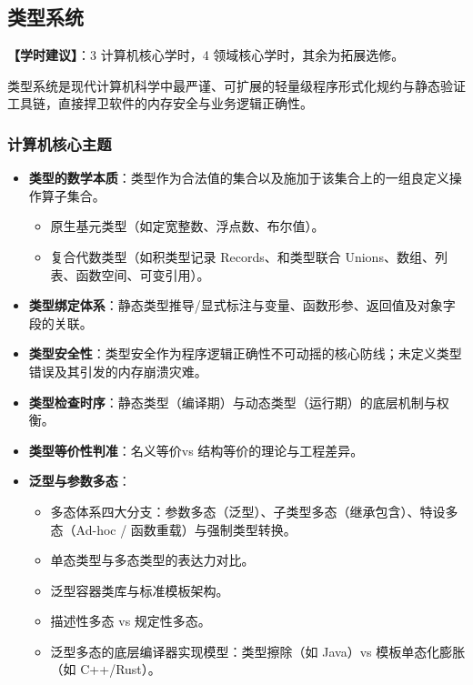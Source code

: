 \subsection{类型系统}
\textbf{【学时建议】}：3 计算机核心学时，4 领域核心学时，其余为拓展选修。

类型系统是现代计算机科学中最严谨、可扩展的轻量级程序形式化规约与静态验证工具链，直接捍卫软件的内存安全与业务逻辑正确性。

\subsubsection{计算机核心主题}
\begin{itemize}
    \item \textbf{类型的数学本质}：类型作为合法值的集合以及施加于该集合上的一组良定义操作算子集合。
    \begin{itemize}
        \item 原生基元类型（如定宽整数、浮点数、布尔值）。
        \item 复合代数类型（如积类型记录 Records、和类型联合 Unions、数组、列表、函数空间、可变引用）。
    \end{itemize}
    \item \textbf{类型绑定体系}：静态类型推导/显式标注与变量、函数形参、返回值及对象字段的关联。
    \item \textbf{类型安全性}：类型安全作为程序逻辑正确性不可动摇的核心防线；未定义类型错误及其引发的内存崩溃灾难。
    \item \textbf{类型检查时序}：静态类型（编译期）与动态类型（运行期）的底层机制与权衡。
    \item \textbf{类型等价性判准}：名义等价vs 结构等价的理论与工程差异。
    \item \textbf{泛型与参数多态}：
    \begin{itemize}
        \item 多态体系四大分支：参数多态（泛型）、子类型多态（继承包含）、特设多态（Ad-hoc / 函数重载）与强制类型转换。
        \item 单态类型与多态类型的表达力对比。
        \item 泛型容器类库与标准模板架构。
        \item 描述性多态 vs 规定性多态。
        \item 泛型多态的底层编译器实现模型：类型擦除（如 Java）vs 模板单态化膨胀（如 C++/Rust）。
    \end{itemize}
\end{itemize}

